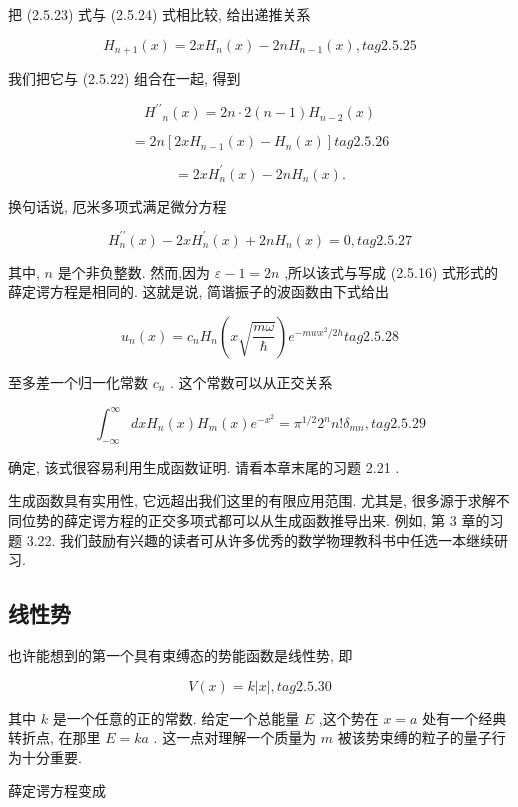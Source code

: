 \documentclass[lang=cn,newtx,10pt,scheme=chinese,thmcnt=section]{elegantbook}
\begin{document}
把 (2.5.23) 式与 (2.5.24) 式相比较, 给出递推关系

$$
{H}_{n + 1}\left( x\right) = {2x}{H}_{n}\left( x\right) - {2n}{H}_{n - 1}\left( x\right) , tag{2.5.25}
$$

我们把它与 (2.5.22) 组合在一起, 得到

$$
{H}^{\prime \prime }{}_{n}\left( x\right) = {2n} \cdot 2\left( {n - 1}\right) {H}_{n - 2}\left( x\right)
$$

$$
= {2n}\left\lbrack {{2x}{H}_{n - 1}\left( x\right) - {H}_{n}\left( x\right) }\right\rbrack tag{2.5.26}
$$

$$
= {2x}{H}_{n}^{\prime }\left( x\right) - {2n}{H}_{n}\left( x\right) \text{.}
$$

换句话说, 厄米多项式满足微分方程

$$
{H}_{n}^{\prime \prime }\left( x\right) - {2x}{H}_{n}^{\prime }\left( x\right) + {2n}{H}_{n}\left( x\right) = 0, tag{2.5.27}
$$

其中, $n$ 是个非负整数. 然而,因为 $\varepsilon - 1 = {2n}$ ,所以该式与写成 (2.5.16) 式形式的薛定谔方程是相同的. 这就是说, 简谐振子的波函数由下式给出

$$
{u}_{n}\left( x\right) = {c}_{n}{H}_{n}\left( {x\sqrt{\frac{m\omega }{\hbar }}}\right) {e}^{-{mw}{x}^{2}/{2h}} tag{2.5.28}
$$

至多差一个归一化常数 ${c}_{n}$ . 这个常数可以从正交关系

$$
{\int }_{-\infty }^{\infty }{dx}{H}_{n}\left( x\right) {H}_{m}\left( x\right) {e}^{-{x}^{2}} = {\pi }^{1/2}{2}^{n}n!{\delta }_{mn}, tag{2.5.29}
$$

确定, 该式很容易利用生成函数证明. 请看本章末尾的习题 2.21 .

生成函数具有实用性, 它远超出我们这里的有限应用范围. 尤其是, 很多源于求解不同位势的薛定谔方程的正交多项式都可以从生成函数推导出来. 例如, 第 3 章的习题 3.22. 我们鼓励有兴趣的读者可从许多优秀的数学物理教科书中任选一本继续研习.

\subsection*{线性势}
也许能想到的第一个具有束缚态的势能函数是线性势, 即

$$
V\left( x\right) = k\left| x\right| , tag{2. 5.30}
$$

其中 $k$ 是一个任意的正的常数. 给定一个总能量 $E$ ,这个势在 $x = a$ 处有一个经典转折点, 在那里 $E = {ka}$ . 这一点对理解一个质量为 $m$ 被该势束缚的粒子的量子行为十分重要.

薛定谔方程变成
\end{document}
